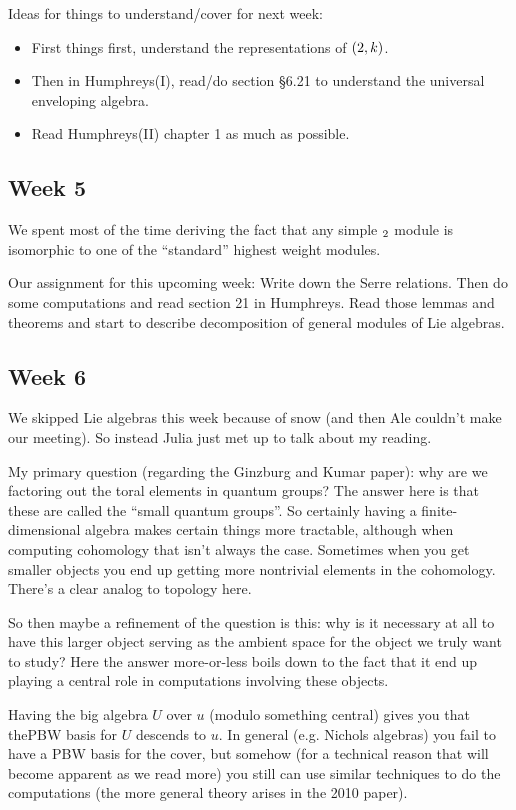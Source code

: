 \documentclass[12pt]{article}
\theoremstyle{nonumberbreak}
\theoremstyle{changebreak}
\theoremstyle{nonumberplain}
\theoremstyle{change}
\let\sl\relax
\newcommand*{\sl}{\mathfrak{sl}}
\begin{document}
Ideas for things to understand/cover for next week:
\begin{itemize}
	\item First things first, understand the representations of $\sl(2,k)$.
	\item Then in Humphreys(I), read/do section \S 6.21 to understand the universal enveloping algebra.
	\item Read Humphreys(II) chapter 1 as much as possible.
\end{itemize}

\subsection{Week 5}
We spent most of the time deriving the fact that any simple $\sl_2$ module is isomorphic to one of the ``standard''
highest weight modules.

Our assignment for this upcoming week:
Write down the Serre relations. Then do some computations and read section 21 in Humphreys. Read those lemmas and theorems and start to describe decomposition of general modules of Lie algebras.

\subsection{Week 6}
We skipped Lie algebras this week because of snow (and then Ale couldn't make our meeting). So instead
Julia just met up to talk about my reading.

My primary question (regarding the Ginzburg and Kumar paper): why are we factoring out the toral elements in quantum groups? 
The answer here is that these are called the ``small quantum groups''. So certainly having a finite-dimensional algebra makes certain things
more tractable, although when computing cohomology that isn't always the case. Sometimes when you get smaller 
objects you end up getting more nontrivial elements in the cohomology. There's a clear analog to topology here.

So then maybe a refinement of the question is this: why is it necessary at all to have this larger object serving as the ambient 
space for the object we truly want to study? Here the answer more-or-less boils down to the fact that it end up playing a central
role in computations involving these objects.

Having the big algebra $U$ over $u$ (modulo something central) gives you that thePBW basis for $U$ descends to 
$u$. In general (e.g. Nichols algebras) you fail to have a PBW basis for the cover, but somehow (for a technical reason that 
will become apparent as we read more) you still can use similar techniques to do the computations (the more general theory arises in the 2010 paper).
\end{document}
